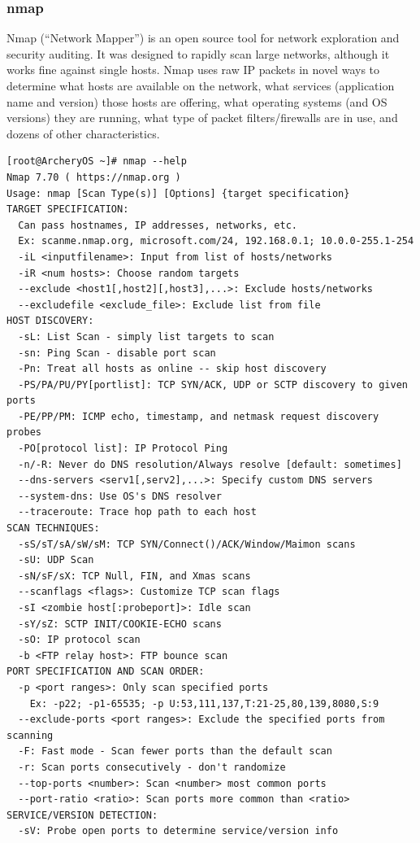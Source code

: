 \documentclass{article}
\begin{document}
\subsubsection{nmap}
Nmap (“Network Mapper”) is an open source tool for network exploration and security auditing. It was designed to rapidly scan large networks, although it works fine against single hosts. Nmap uses raw IP packets in novel ways to determine what hosts are available on the network, what services (application name and version) those hosts are offering, what operating systems (and OS versions) they are running, what type of packet filters/firewalls are in use, and dozens of other characteristics.
\begin{lstlisting}
[root@ArcheryOS ~]# nmap --help
Nmap 7.70 ( https://nmap.org )
Usage: nmap [Scan Type(s)] [Options] {target specification}
TARGET SPECIFICATION:
  Can pass hostnames, IP addresses, networks, etc.
  Ex: scanme.nmap.org, microsoft.com/24, 192.168.0.1; 10.0.0-255.1-254
  -iL <inputfilename>: Input from list of hosts/networks
  -iR <num hosts>: Choose random targets
  --exclude <host1[,host2][,host3],...>: Exclude hosts/networks
  --excludefile <exclude_file>: Exclude list from file
HOST DISCOVERY:
  -sL: List Scan - simply list targets to scan
  -sn: Ping Scan - disable port scan
  -Pn: Treat all hosts as online -- skip host discovery
  -PS/PA/PU/PY[portlist]: TCP SYN/ACK, UDP or SCTP discovery to given ports
  -PE/PP/PM: ICMP echo, timestamp, and netmask request discovery probes
  -PO[protocol list]: IP Protocol Ping
  -n/-R: Never do DNS resolution/Always resolve [default: sometimes]
  --dns-servers <serv1[,serv2],...>: Specify custom DNS servers
  --system-dns: Use OS's DNS resolver
  --traceroute: Trace hop path to each host
SCAN TECHNIQUES:
  -sS/sT/sA/sW/sM: TCP SYN/Connect()/ACK/Window/Maimon scans
  -sU: UDP Scan
  -sN/sF/sX: TCP Null, FIN, and Xmas scans
  --scanflags <flags>: Customize TCP scan flags
  -sI <zombie host[:probeport]>: Idle scan
  -sY/sZ: SCTP INIT/COOKIE-ECHO scans
  -sO: IP protocol scan
  -b <FTP relay host>: FTP bounce scan
PORT SPECIFICATION AND SCAN ORDER:
  -p <port ranges>: Only scan specified ports
    Ex: -p22; -p1-65535; -p U:53,111,137,T:21-25,80,139,8080,S:9
  --exclude-ports <port ranges>: Exclude the specified ports from scanning
  -F: Fast mode - Scan fewer ports than the default scan
  -r: Scan ports consecutively - don't randomize
  --top-ports <number>: Scan <number> most common ports
  --port-ratio <ratio>: Scan ports more common than <ratio>
SERVICE/VERSION DETECTION:
  -sV: Probe open ports to determine service/version info

\end{lstlisting}
\end{document}
